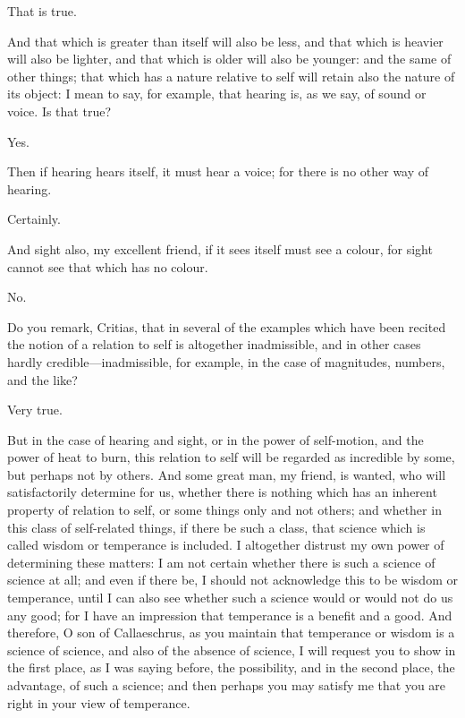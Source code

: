 \documentclass[11pt,letter]{article}
\begin{document}
\par  That is true.

\par  And that which is greater than itself will also be less, and that which is heavier will also be lighter, and that which is older will also be younger: and the same of other things; that which has a nature relative to self will retain also the nature of its object: I mean to say, for example, that hearing is, as we say, of sound or voice. Is that true?

\par  Yes.

\par  Then if hearing hears itself, it must hear a voice; for there is no other way of hearing.

\par  Certainly.

\par  And sight also, my excellent friend, if it sees itself must see a colour, for sight cannot see that which has no colour.

\par  No.

\par  Do you remark, Critias, that in several of the examples which have been recited the notion of a relation to self is altogether inadmissible, and in other cases hardly credible—inadmissible, for example, in the case of magnitudes, numbers, and the like?

\par  Very true.

\par  But in the case of hearing and sight, or in the power of self-motion, and the power of heat to burn, this relation to self will be regarded as incredible by some, but perhaps not by others. And some great man, my friend, is wanted, who will satisfactorily determine for us, whether there is nothing which has an inherent property of relation to self, or some things only and not others; and whether in this class of self-related things, if there be such a class, that science which is called wisdom or temperance is included. I altogether distrust my own power of determining these matters: I am not certain whether there is such a science of science at all; and even if there be, I should not acknowledge this to be wisdom or temperance, until I can also see whether such a science would or would not do us any good; for I have an impression that temperance is a benefit and a good. And therefore, O son of Callaeschrus, as you maintain that temperance or wisdom is a science of science, and also of the absence of science, I will request you to show in the first place, as I was saying before, the possibility, and in the second place, the advantage, of such a science; and then perhaps you may satisfy me that you are right in your view of temperance.
\end{document}
